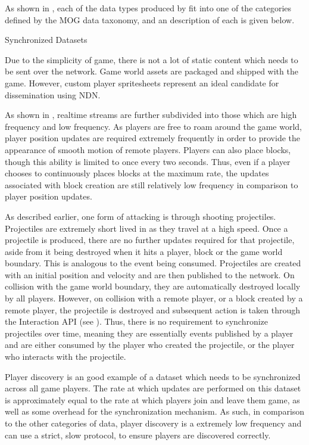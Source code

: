 As shown in , each of the data types produced by \game{} fit into one of the categories defined by the MOG data taxonomy, and an description of each is given below.

\begin{labeling}{Synchronized Datasets }
    \item[Static Content] Due to the simplicity of game, there is not a lot of static content which needs to be sent over the network. Game world assets are packaged and shipped with the game. However, custom player spritesheets represent an ideal candidate for dissemination using NDN.
    \item[Realtime Streams] As shown in , realtime streams are further subdivided into those which are high frequency and low frequency.\break\break
    As players are free to roam around the game world, player position updates are required extremely frequently in order to provide the appearance of smooth motion of remote players.\break\break
    Players can also place blocks, though this ability is limited to once every two seconds. Thus, even if a player chooses to continuously places blocks at the maximum rate, the updates associated with block creation are still relatively low frequency in comparison to player position updates.
    \item[Non Synced] As described earlier, one form of attacking is through shooting projectiles. Projectiles are extremely short lived in \game{} as they travel at a high speed. Once a projectile is produced, there are no further updates required for that projectile, aside from it being destroyed when it hits a player, block or the game world boundary. This is analogous to the event being consumed. Projectiles are created with an initial position and velocity and are then published to the network. On collision with the game world boundary, they are automatically destroyed locally by all players. However, on collision with a remote player, or a block created by a remote player, the projectile is destroyed and subsequent action is taken through the Interaction API (see ). Thus, there is no requirement to synchronize projectiles over time, meaning they are essentially events published by a player and are either consumed by the player who created the projectile, or the player who interacts with the projectile.
    \item[Synchronized Datasets] Player discovery is an good example of a dataset which needs to be synchronized across all game players. The rate at which updates are performed on this dataset is approximately equal to the rate at which players join and leave them game, as well as some overhead for the synchronization mechanism. As such, in comparison to the other categories of data, player discovery is a extremely low frequency and can use a strict, slow protocol, to ensure players are discovered correctly.
\end{labeling}

